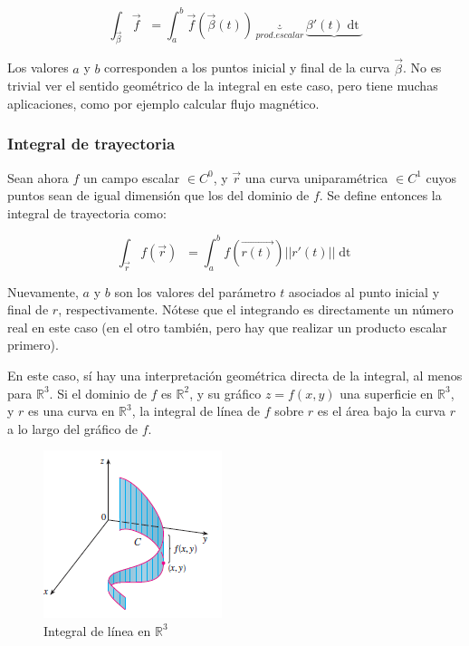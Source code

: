 \documentclass{article}
\renewcommand{\Bbb}{\mathbb}
\begin{document}
\begin{equation}
\int_{\overrightarrow{\beta}} \overrightarrow{f} \mathop{\overrightarrow{d\beta}} = \int_{a}^{b} \overrightarrow{f}(\overrightarrow{\beta}(t)) \underbrace{\cdot}_{prod. escalar} \underbrace{ \beta '(t) \mathop{dt} }_{\mathop{\overrightarrow{d\beta}}}
\end{equation}

Los valores $a$ y $b$ corresponden a los puntos inicial y final de la curva $\overrightarrow{\beta}$. No es trivial ver el sentido geométrico de la integral en este caso, pero tiene muchas aplicaciones, como por ejemplo calcular flujo magnético.

\subsubsection{Integral de trayectoria}

Sean ahora $f$ un campo escalar $\in C^0$, y $\overrightarrow{r}$ una curva uniparamétrica $\in C^1$ cuyos puntos sean de igual dimensión que los del dominio de $f$. Se define entonces la integral de trayectoria como:

\begin{equation}
\int_{\overrightarrow{r}} f(\overrightarrow{r}) \mathop{\overrightarrow{dr}} = \int_{a}^{b} f(\overrightarrow{r(t)}) ||r'(t)|| \mathop{dt}
\end{equation}

Nuevamente, $a$ y $b$ son los valores del parámetro $t$ asociados al punto inicial y final de $r$, respectivamente. Nótese que el integrando es directamente un número real en este caso (en el otro también, pero hay que realizar un producto escalar primero).

En este caso, sí hay una interpretación geométrica directa de la integral, al menos para $\Bbb R^3$. Si el dominio de $f$ es $\Bbb R^2$, y su gráfico $z = f(x,y)$ una superficie en $\Bbb R^3$, y $r$ es una curva en $\Bbb R^3$, la integral de línea de $f$ sobre $r$ es el área bajo la curva $r$ a lo largo del gráfico de $f$.

\begin{figure}[ht]
\caption{Integral de línea en $\Bbb R^3$}
\centering
\includegraphics[scale=0.6]{img/teo_fig019_li.png} 
\end{figure}
\end{document}
